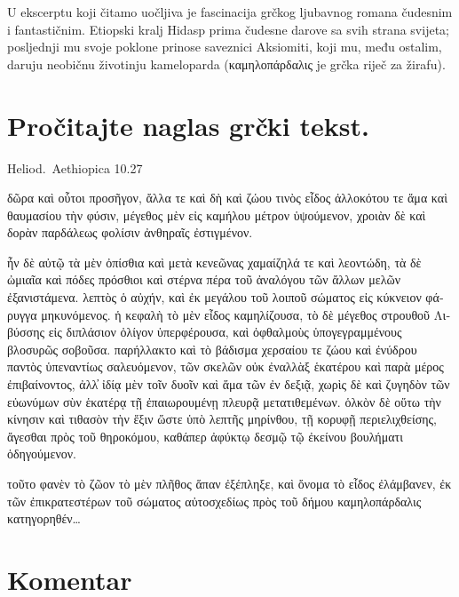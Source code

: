 U ekscerptu koji čitamo uočljiva je fascinacija grčkog ljubavnog romana čudesnim i fantastičnim. Etiopski kralj Hidasp prima čudesne darove sa svih strana svijeta; posljednji mu svoje poklone prinose saveznici Aksiomiti, koji mu, među ostalim, daruju neobičnu životinju kameloparda (\textgreek[variant=ancient]{καμηλοπάρδαλις} je grčka riječ za žirafu).




\section*{Pročitajte naglas grčki tekst.}

Heliod.\ Aethiopica 10.27

\medskip


{\large

\begin{greek}

\noindent δῶρα καὶ οὗτοι προσῆγον, ἄλλα τε καὶ δὴ καὶ ζώου τινὸς εἶδος ἀλλοκότου τε ἅμα καὶ θαυμασίου τὴν φύσιν, μέγεθος μὲν εἰς καμήλου μέτρον ὑψούμενον, χροιὰν δὲ καὶ δορὰν παρδάλεως φολίσιν ἀνθηραῖς ἐστιγμένον. 

\noindent ἦν δὲ αὐτῷ τὰ μὲν ὀπίσθια καὶ μετὰ κενεῶνας χαμαίζηλά τε καὶ λεοντώδη, τὰ δὲ ὠμιαῖα καὶ πόδες πρόσθιοι καὶ στέρνα πέρα τοῦ ἀναλόγου τῶν ἄλλων μελῶν ἐξανιστάμενα. λεπτὸς ὁ αὐχήν, καὶ ἐκ μεγάλου τοῦ λοιποῦ σώματος εἰς κύκνειον φάρυγγα μηκυνόμενος. ἡ κεφαλὴ τὸ μὲν εἶδος καμηλίζουσα, τὸ δὲ μέγεθος στρουθοῦ Λιβύσσης εἰς διπλάσιον ὀλίγον ὑπερφέρουσα, καὶ ὀφθαλμοὺς ὑπογεγραμμένους βλοσυρῶς σοβοῦσα. παρήλλακτο καὶ τὸ βάδισμα χερσαίου τε ζώου καὶ ἐνύδρου παντὸς ὑπεναντίως σαλευόμενον, τῶν σκελῶν οὐκ ἐναλλὰξ ἑκατέρου καὶ παρὰ μέρος ἐπιβαίνοντος, ἀλλ̓ ἰδίᾳ μὲν τοῖν δυοῖν καὶ ἅμα τῶν ἐν δεξιᾷ, χωρὶς δὲ καὶ ζυγηδὸν τῶν εὐωνύμων σὺν ἑκατέρᾳ τῇ ἐπαιωρουμένῃ πλευρᾷ μετατιθεμένων. ὁλκὸν δὲ οὕτω τὴν κίνησιν καὶ τιθασὸν τὴν ἕξιν ὥστε ὑπὸ λεπτῆς μηρίνθου, τῇ κορυφῇ περιελιχθείσης, ἄγεσθαι πρὸς τοῦ θηροκόμου, καθάπερ ἀφύκτῳ δεσμῷ τῷ ἐκείνου βουλήματι ὁδηγούμενον. 

\noindent τοῦτο φανὲν τὸ ζῶον τὸ μὲν πλῆθος ἅπαν ἐξέπληξε, καὶ ὄνομα τὸ εἶδος ἐλάμβανεν, ἐκ τῶν ἐπικρατεστέρων τοῦ σώματος αὐτοσχεδίως πρὸς τοῦ δήμου καμηλοπάρδαλις κατηγορηθέν\dots


\end{greek}

}


\section*{Komentar}

